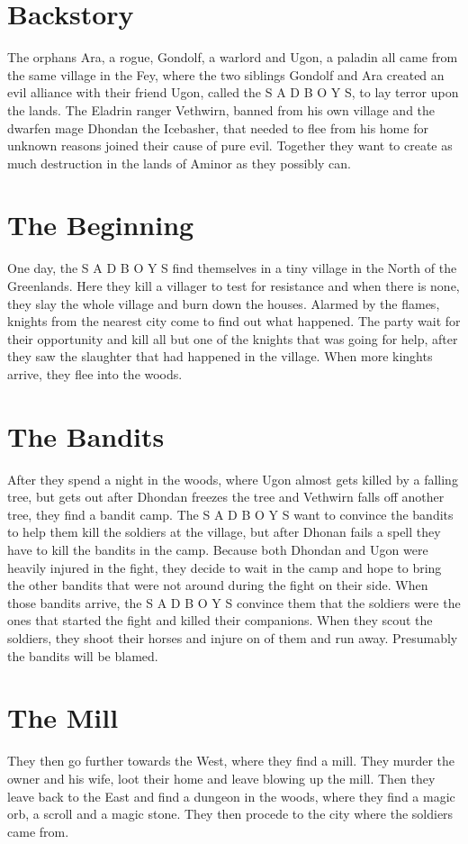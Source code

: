 \documentclass[oneside]{book}
\begin{document}
\chapter{Backstory}
The orphans Ara, a rogue, Gondolf, a warlord  and Ugon, a paladin all came from the same village in the Fey, where the two siblings Gondolf and Ara created an evil alliance with their friend Ugon,
called the S A D B O Y S, to lay terror upon the lands.
The Eladrin ranger Vethwirn, banned from his own village and the dwarfen mage Dhondan the Icebasher, that needed to flee from his home for unknown reasons joined their cause of pure evil.
Together they want to create as much destruction in the lands of Aminor as they possibly can.
\chapter{The Beginning}
One day, the S A D B O Y S find themselves in a tiny village in the North of the Greenlands.
Here they kill a villager to test for resistance and when there is none, they slay the whole village and burn down the houses.
Alarmed by the flames, knights from the nearest city come to find out what happened.
The party wait for their opportunity and kill all but one of the knights that was going for help, after they saw the slaughter that had happened in the village.
When more kinghts arrive, they flee into the woods.
\chapter{The Bandits}
After they spend a night in the woods, where Ugon almost gets killed by a falling tree, but gets out after Dhondan freezes the tree and Vethwirn falls off another tree, they find a bandit camp.
The S A D B O Y S want to convince the bandits to help them kill the soldiers at the village, but after Dhonan fails a spell they have to kill the bandits in the camp.
Because both Dhondan and Ugon were heavily injured in the fight, they decide to wait in the camp and hope to bring the other bandits that were not around during the fight on their side.
When those bandits arrive, the S A D B O Y S convince them that the soldiers were the ones that started the fight and killed their companions.
When they scout the soldiers, they shoot their horses and injure on of them and run away. Presumably the bandits will be blamed.
\chapter{The Mill}
They then go further towards the West, where they find a mill. They murder the owner and his wife, loot their home and leave blowing up the mill.
Then they leave back to the East and find a dungeon in the woods, where they find a magic orb, a scroll and a magic stone.
They then procede to the city where the soldiers came from.
\end{document}
